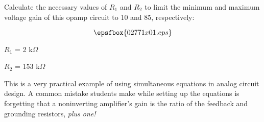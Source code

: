 

Calculate the necessary values of $R_1$ and $R_2$ to limit the minimum and maximum voltage gain of this opamp circuit to 10 and 85, respectively:

$$\epsfbox{02771x01.eps}$$







$R_1$ = 2 k$\Omega$

\vskip 10pt

$R_2$ = 153 k$\Omega$







This is a very practical example of using simultaneous equations in analog circuit design.  A common mistake students make while setting up the equations is forgetting that a noninverting amplifier's gain is the ratio of the feedback and grounding resistors, {\it plus one!}




